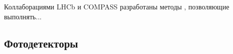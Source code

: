 
Коллаборациями LHCb и COMPASS разработаны методы \todo, позволяющие выполнять...


%                                      

\subsection{Фотодетекторы}

